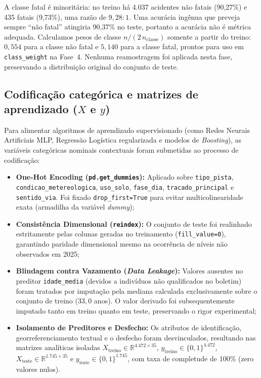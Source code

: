 \documentclass[11pt,a4paper]{article}
\begin{document}
A classe fatal é minoritária: no treino há 4.037 acidentes não fatais (90,27\%) e 435 fatais (9,73\%), uma razão de $9,28:1$. Uma acurácia ingênua que preveja sempre ``não fatal'' atingiria 90,37\% no teste, portanto a acurácia não é métrica adequada. Calculamos pesos de classe $n/(2\,n_{\text{classe}})$ somente a partir do treino: $0,554$ para a classe não fatal e $5,140$ para a classe fatal, prontos para uso em \texttt{class\_weight} na Fase~4. Nenhuma reamostragem foi aplicada nesta fase, preservando a distribuição original do conjunto de teste.

\subsection{Codificação categórica e matrizes de aprendizado \texorpdfstring{($X$ e $y$)}{(X e y)}}

Para alimentar algoritmos de aprendizado supervisionado (como Redes Neurais Artificiais MLP, Regressão Logística regularizada e modelos de \textit{Boosting}), as variáveis categóricas nominais contextuais foram submetidas ao processo de codificação:
\begin{itemize}
  \item \textbf{One-Hot Encoding (\texttt{pd.get\_dummies}):} Aplicado sobre \texttt{tipo\_pista}, \texttt{condicao\_metereologica}, \texttt{uso\_solo}, \texttt{fase\_dia}, \texttt{tracado\_principal} e \texttt{sentido\_via}. Foi fixado \texttt{drop\_first=True} para evitar multicolinearidade exata (armadilha da variável \textit{dummy});
  \item \textbf{Consistência Dimensional (\texttt{reindex}):} O conjunto de teste foi realinhado estritamente pelas colunas geradas no treinamento (\texttt{fill\_value=0}), garantindo paridade dimensional mesmo na ocorrência de níveis não observados em 2025;
  \item \textbf{Blindagem contra Vazamento (\textit{Data Leakage}):} Valores ausentes no preditor \texttt{idade\_media} (devidos a indivíduos não qualificados no boletim) foram tratados por imputação pela mediana calculada exclusivamente sobre o conjunto de treino ($33{,}0$ anos). O valor derivado foi subsequentemente imputado tanto em treino quanto em teste, preservando o rigor experimental;
  \item \textbf{Isolamento de Preditores e Desfecho:} Os atributos de identificação, georreferenciamento textual e o desfecho foram desvinculados, resultando nas matrizes analíticas isoladas $X_{\text{treino}} \in \mathbb{R}^{4.472 \times 35}$, $y_{\text{treino}} \in \{0, 1\}^{4.472}$, $X_{\text{teste}} \in \mathbb{R}^{1.745 \times 35}$ e $y_{\text{teste}} \in \{0, 1\}^{1.745}$, com taxa de completude de 100\% (zero valores nulos).
\end{itemize}
\end{document}
